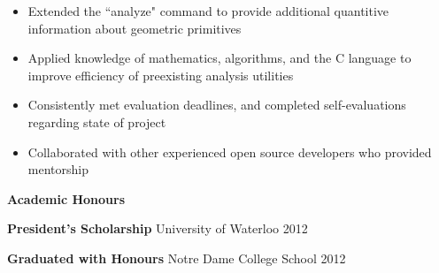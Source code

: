 \documentclass[10pt]{article}
\newcommand{\resheading}[1]{{\large \colorbox{headercol}{\begin{minipage}{\textwidth}{\textbf{#1 \vphantom{p\^{E}}}}\end{minipage}}}}
\newcommand{\resitem}[2]{\item{\textbf{#1} #2}}
\begin{document}
\begin{description}
\begin{itemize}
        \item{Extended the ``analyze" command to provide additional quantitive information about geometric primitives}
        \item{Applied knowledge of mathematics, algorithms, and the C language to improve efficiency of preexisting analysis utilities}
        \item{Consistently met evaluation deadlines, and completed self-evaluations regarding state of project}
        \item{Collaborated with other experienced open source developers who provided mentorship}
    \end{itemize}
\end{description}

\resheading{Academic Honours}
\begin{description}
    \resitem{President's Scholarship} {University of Waterloo \hfill 2012}
    \resitem{Graduated with Honours} {Notre Dame College School \hfill 2012}
\end{description}
\end{document}
